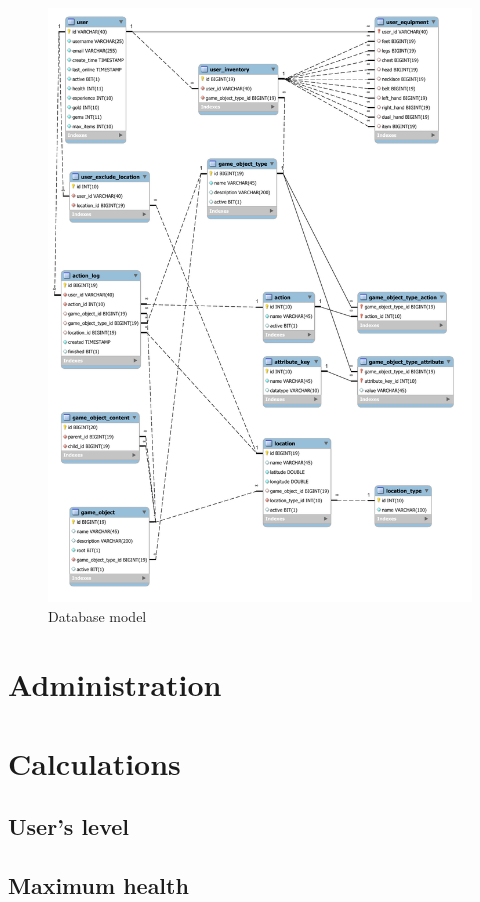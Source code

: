 	\begin{figure}[h]	
		\includegraphics[width=\textwidth]{figures/DatabaseModel}
		\centering
		\caption{Database model}
		\label{fig:dbmodel}	
	\end{figure}

\section{Administration}

\section{Calculations}
	\subsection{User's level}
	\subsection{Maximum health}
